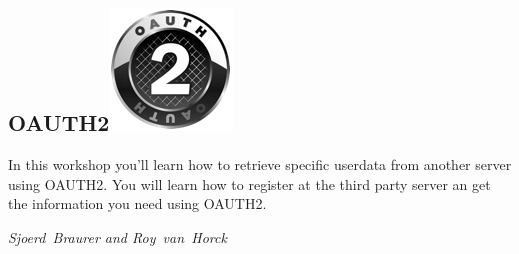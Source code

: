 
\subsection*{OAUTH2\hfill\includegraphics[width=.25\linewidth]{images/oauth-2-sm.png}}
In this workshop you'll learn how to retrieve specific userdata from
another server using OAUTH2. 
You will learn how to register at the third party server an get the
information you need using OAUTH2.

\hfill\textit{Sjoerd~Braurer and Roy~van~Horck}
